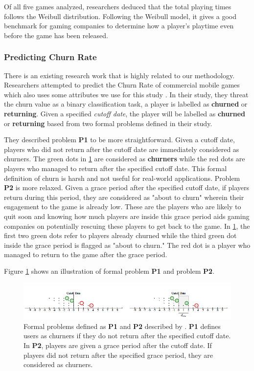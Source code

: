 Of all five games analyzed, researchers deduced that the total playing times follows the Weibull distribution. Following the Weibull model, it gives a good benchmark for gaming companies to determine how a player's playtime even before the game has been released.

\subsubsection{Predicting Churn Rate}
There is an existing research work that is highly related to our methodology. Researchers attempted to predict the Churn Rate of commercial mobile games which also uses some attributes we use for this study \cite{ref:predicting_player_churn}. In their study, they threat the churn value as a binary classification task, a player is labelled as \textbf{churned} or \textbf{returning}. Given a specified \textit{cutoff date}, the player will be labelled as \textbf{churned} or \textbf{returning} based from two formal problems defined in their study.

They described problem \textbf{P1} to be more straightforward. Given a cutoff date, players who did not return after the cutoff date are immediately considered as churners. The green dots in \ref{fig:churn_figure} are considered as \textbf{churners} while the red dots are players who managed to return after the specified cutoff date. This formal definition of churn is harsh and not useful for real-world applications. Problem \textbf{P2} is more relaxed. Given a grace period after the specified cutoff date, if players return during this period, they are considered as "about to churn" wherein their engagement to the game is already low. These are the players who are likely to quit soon and knowing how much players are inside this grace period aids gaming companies on potentially rescuing these players to get back to the game. In \ref{fig:churn_figure}, the first two green dots refer to players already churned while the third green dot inside the grace period is flagged as "about to churn." The red dot is a player who managed to return to the game after the grace period.

Figure \ref{fig:churn_figure} shows an illustration of formal problem \textbf{P1} and problem \textbf{P2}.

\begin{figure}[h]
\centering
\includegraphics[scale=0.6]{figures/churn.png}
\caption{Formal problems defined as \textbf{P1} and \textbf{P2} described by \cite{ref:predicting_player_churn}. \textbf{P1} defines users as churners if they do not return after the specified cutoff date. In \textbf{P2}, players are given a grace period after the cutoff date. If players did not return after the specified grace period, they are considered as churners. }
\label{fig:churn_figure}
\end{figure}


